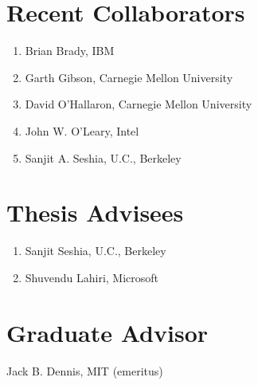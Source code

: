 \documentclass{article}
\newenvironment{denseenumerate}%
	{\begin{enumerate}\setlength{\itemsep}{0pt}\setlength{\parsep}{0pt}}%
	{\end{enumerate}}
\begin{document}
\section*{Recent Collaborators}
\begin{denseenumerate}
\item Brian Brady, IBM
\item Garth Gibson, Carnegie Mellon University
\item David O'Hallaron, Carnegie Mellon University
\item John W. O'Leary, Intel
\item Sanjit A. Seshia, U.C., Berkeley
\end{denseenumerate}

\section*{Thesis Advisees}
\begin{denseenumerate}
\item Sanjit Seshia, U.C., Berkeley
\item Shuvendu Lahiri, Microsoft
\end{denseenumerate}

\section*{Graduate Advisor}
Jack B. Dennis, MIT (emeritus)


%
\end{document}
